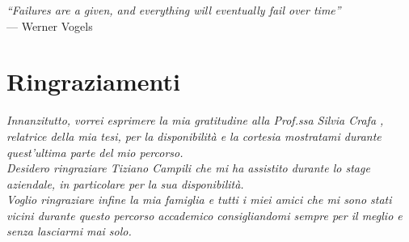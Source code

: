 
{}
{}

\begin{flushright}{
	\slshape    
	``Failures are a given, and everything will eventually fail over time''} \\ 
	\medskip
    --- Werner Vogels
\end{flushright}


\bigskip

\begingroup
\let\clearpage\relax
\let\cleardoublepage\relax
\let\cleardoublepage\relax

\chapter*{Ringraziamenti}
\noindent \textit{Innanzitutto, vorrei esprimere la mia gratitudine alla Prof.ssa Silvia Crafa , relatrice della mia tesi, per la disponibilità e la cortesia mostratami durante quest'ultima parte del mio percorso.}\\

\noindent \textit{Desidero ringraziare Tiziano Campili che mi ha assistito durante lo \textit{stage} aziendale, in particolare per la sua disponibilità.}\\

\noindent \textit{Voglio ringraziare infine la mia famiglia e tutti i miei amici che mi sono stati vicini durante questo percorso accademico consigliandomi sempre per il meglio e senza lasciarmi mai solo.}\\



\endgroup

